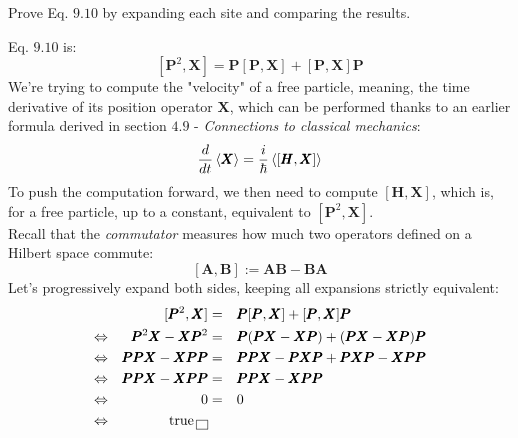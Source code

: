 \documentclass[solutions.tex]{subfiles}
\begin{document}
\maketitle
\begin{exercise} Prove Eq. $9.10$ by expanding each site and
comparing the results.
\end{exercise}
Eq. $9.10$ is:
\[
	[\bm{P}^2, \bm{X}] = \bm{P}[\bm{P}, \bm{X}] + [\bm{P}, \bm{X}]\bm{P}
\]
We're trying to compute the "velocity" of a free particle, meaning, the time
derivative of its position operator $\bm{X}$, which can be performed thanks
to an earlier formula derived in section $4.9$ - \textit{Connections to classical
mechanics}:
\[
	\frac{d}{dt}\left\langle \pmb{X} \right\rangle = \frac{i}{\hbar}\left\langle [\pmb{H},\pmb{X}] \right\rangle
\]
To push the computation forward, we then need to compute $[\bm{H},\bm{X}]$,
which is, for a free particle, up to a constant, equivalent to
$[\bm{P}^2,\bm{X}]$. \\

Recall that the \textit{commutator} measures how much two operators defined
on a Hilbert space commute:
\[
	[\bm{A}, \bm{B}] := \bm{A}\bm{B} - \bm{B}\bm{A}
\]
Let's progressively expand both sides, keeping all expansions strictly equivalent:
\begin{equation*}\begin{aligned}
	~ &&
		[\pmb{P}^2, \pmb{X}] &=&&
		\pmb{P}[\pmb{P}, \pmb{X}] + [\pmb{P}, \pmb{X}]\pmb{P} \\
	\Leftrightarrow &&
		\pmb{P}^2\pmb{X} - \pmb{X}\pmb{P}^2 &=&&
		\pmb{P}(\pmb{P}\pmb{X} - \pmb{X}\pmb{P}) + (\pmb{P}\pmb{X} - \pmb{X}\pmb{P})\pmb{P} \\
	\Leftrightarrow &&
		\pmb{P}\pmb{P}\pmb{X} - \pmb{X}\pmb{P}\pmb{P} &=&&
		\pmb{P}\pmb{P}\pmb{X} - \pmb{P}\pmb{X}\pmb{P}
			+ \pmb{P}\pmb{X}\pmb{P} - \pmb{X}\pmb{P}\pmb{P} \\
	\Leftrightarrow &&
		\pmb{P}\pmb{P}\pmb{X} - \pmb{X}\pmb{P}\pmb{P} &=&&
		\pmb{P}\pmb{P}\pmb{X} - \pmb{X}\pmb{P}\pmb{P} \\
	\Leftrightarrow && 0 &=&& 0 \\
	\Leftrightarrow && \text{true} \,\boxed{\,}
\end{aligned}\end{equation*}
\end{document}
